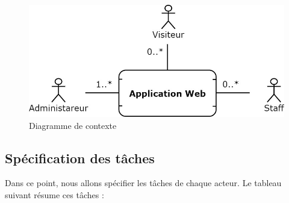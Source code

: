 \begin{figure}[H]
    \centering
    \includegraphics[scale=0.5]{ACR/Diagrammes/contexte.jpg}
    \caption{Diagramme de contexte}
\end{figure}

\subsection{Spécification des tâches}
Dans ce point, nous allons spécifier les tâches de chaque acteur. Le tableau suivant résume ces tâches :

